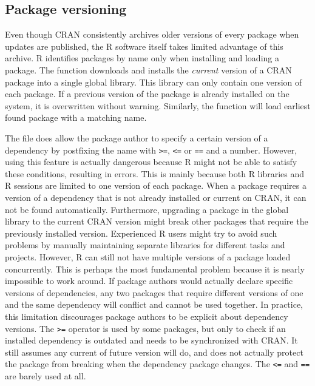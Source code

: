 
\subsection{Package versioning}

Even though CRAN consistently archives older versions of every package when
updates are published, the R software itself takes limited advantage of this
archive. R identifies packages by name only when installing and loading a
package. The  function downloads and installs the
\emph{current} version of a CRAN package into a single global library. This
library can only contain one version of each package. If a previous version of
the package is already installed on the system, it is overwritten without
warning. Similarly, the  function will load earliest found
package with a matching name. 

The  file does allow the package author to specify a certain
version of a dependency by postfixing the name with \texttt{>=}, \texttt{<=} or
\texttt{==} and a number. However, using this feature is actually dangerous
because R might not be able to satisfy these conditions, resulting in errors.
This is mainly because both R libraries and R sessions are limited to one
version of each package. When a package requires a version of a dependency that
is not already installed or current on CRAN, it can not be found automatically.
Furthermore, upgrading a package in the global library to the current CRAN
version might break other packages that require the previously installed
version. Experienced R users might try to avoid such problems by manually
maintaining separate libraries for different tasks and projects. However, R can
still not have multiple versions of a package loaded concurrently. This is
perhaps the most fundamental problem because it is nearly impossible to work
around. If package authors would actually declare specific versions of
dependencies, any two packages that require different versions of one and the
same dependency will conflict and cannot be used together. In practice, this
limitation discourages package authors to be explicit about dependency
versions. The \texttt{>=} operator is used by some packages, but only to check
if an installed dependency is outdated and needs to be synchronized with CRAN.
It still assumes any current of future version will do, and does not actually
protect the package from breaking when the dependency package changes. The
\texttt{<=} and \texttt{==} are barely used at all.

